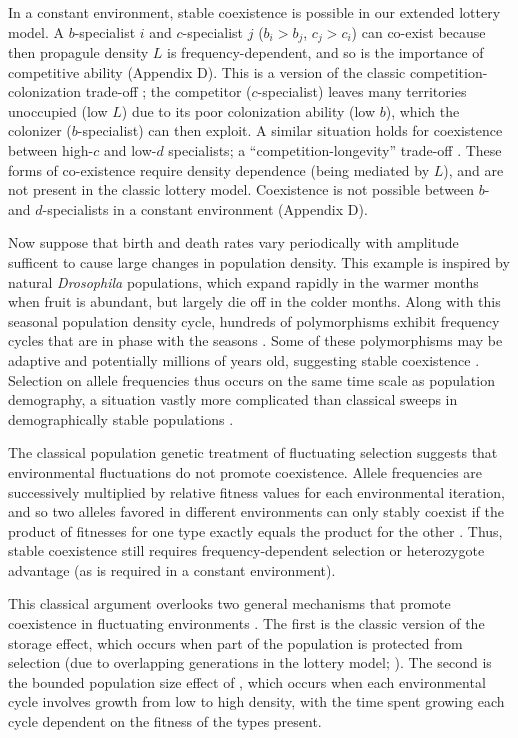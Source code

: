 \documentclass[11pt]{article}
\begin{document}
In a constant environment, stable coexistence is possible in our extended lottery model. A $b$-specialist $i$ and $c$-specialist $j$ ($b_i>b_j$, $c_j>c_i$) can co-exist because then propagule density $L$ is frequency-dependent, and so is the importance of competitive ability (Appendix D). This is a version of the classic competition-colonization trade-off \citep{tilman_94,levins_71}; the competitor ($c$-specialist) leaves many territories unoccupied (low $L$) due to its poor colonization ability (low $b$), which the colonizer ($b$-specialist) can then exploit. A similar situation holds for coexistence between high-$c$ and low-$d$ specialists; a ``competition-longevity'' trade-off \citep{tilman_94}. These forms of co-existence require density dependence (being mediated by $L$), and are not present in the classic lottery model. Coexistence is not possible between $b$- and $d$-specialists in a constant environment (Appendix D). 

Now suppose that birth and death rates vary periodically with amplitude sufficent to cause large changes in population density. This example is inspired by natural \textit{Drosophila} populations, which expand rapidly in the warmer months when fruit is abundant, but largely die off in the colder months. Along with this seasonal population density cycle, hundreds of polymorphisms exhibit frequency cycles that are in phase with the seasons \citep{bergland_14}. Some of these polymorphisms may be adaptive and potentially millions of years old, suggesting stable coexistence \citep{bergland_14,messer_2016}. Selection on allele frequencies thus occurs on the same time scale as population demography, a situation vastly more complicated than classical sweeps in demographically stable populations \citep{messer_2016}.

The classical population genetic treatment of fluctuating selection suggests that environmental fluctuations do not promote coexistence. Allele frequencies are successively multiplied by relative fitness values for each environmental iteration, and so two alleles favored in different environments can only stably coexist if the product of fitnesses for one type exactly equals the product for the other \citep{dempster_1955}. Thus, stable coexistence still requires frequency-dependent selection or heterozygote advantage (as is required in a constant environment). 

This classical argument overlooks two general mechanisms that promote coexistence in fluctuating environments \citep{messer_2016}. The first is the classic version of the storage effect, which occurs when part of the population is protected from selection (due to overlapping generations in the lottery model; \citealt{chesson_1981}). The second is the bounded population size effect of \cite{yi_2013}, which occurs when each environmental cycle involves growth from low to high density, with the time spent growing each cycle dependent on the fitness of the types present. 
\end{document}
